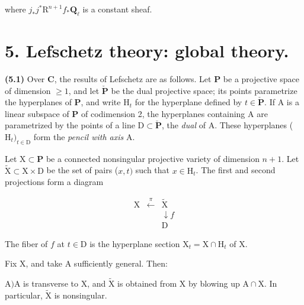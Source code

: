 \documentclass[10pt,leqno]{article}
\begin{document}
\noindent where \(j_{*}j^{*}\mathrm{R}^{n+1}f_{*}\mathbf{Q}_{\ell }\) is a constant sheaf.\par

\section*{5. Lefschetz theory: global theory.}

\noindent \textbf{(5.1)} Over \(\mathbf{C}\), the results of Lefschetz are as follows. Let \(\mathbf{P}\) be a projective space of dimension \(\geq 1\), and let \(\check{\mathbf{P}}\) be the dual projective space; its points parametrize the hyperplanes of \(\mathbf{P}\), and write \(\mathrm{H}_{t}\) for the hyperplane defined by \(t\in \check{\mathbf{P}}\). If \(\mathrm{A}\) is a linear subspace of \(\mathbf{P}\) of codimension 2, the hyperplanes containing \(\mathrm{A}\) are parametrized by the points of a line \(\mathrm{D}\subset \check{\mathbf{P}}\), the \emph{dual} of \(\mathrm{A}\). These hyperplanes (\(\mathrm{H}_{t})_{t\in \mathrm{D}}\) form the \emph{pencil with axis} \(\mathrm{A}\).\par

\noindent Let \(\mathrm{X}\subset \mathbf{P}\) be a connected nonsingular projective variety of dimension \(n+1\). Let \(\widetilde{\mathrm{X}}\subset \mathrm{X}\times \mathrm{D}\) be the set of pairs (\(x,t)\) such that \(x\in \mathrm{H}_{t}\). The first and second projections form a diagram\par

\[\begin{array}{ccc}\mathrm X&\xleftarrow{\pi}&\widetilde{\mathrm X}\\ &&\downarrow\!{f}\\ &&\mathrm D\end{array}\tag{5.1.1}\]

\noindent The fiber of \(f\) at \(t\in \mathrm{D}\) is the hyperplane section \(\mathrm{X}_{t}=\mathrm{X}\cap \mathrm{H}_{t}\) of \(\mathrm{X}\).\par

\clearpage

\label{physical-19}\par\smallskip

\noindent Fix \(\mathrm{X}\), and take \(\mathrm{A}\) sufficiently general. Then:\par

\noindent \(\mathrm{A}) \mathrm{A}\) is transverse to \(\mathrm{X}\), and \(\widetilde{\mathrm{X}}\) is obtained from \(\mathrm{X}\) by blowing up \(\mathrm{A}\cap \mathrm{X}\). In particular, \(\widetilde{\mathrm{X}}\) is nonsingular.\par
\end{document}
